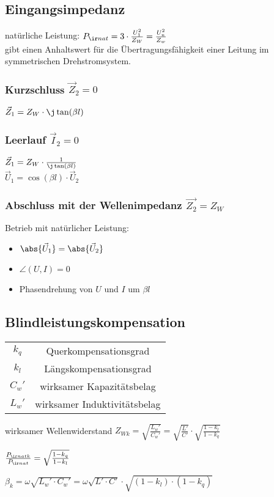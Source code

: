 \documentclass[german]{latex4ei/latex4ei_sheet}
\begin{document}
\begin{sectionbox}
	\subsection{Eingangsimpedanz}
	natürliche Leistung: $P_{\ir nat} = 3 \cdot \frac{U_1^2}{Z_W} = \frac{U_n^2}{Z_w}$ \\
	gibt einen Anhaltswert für die Übertragungsfähigkeit einer Leitung im symmetrischen Drehstromsystem.\\

	\subsubsection{Kurzschluss $\vec Z_2 = 0$}
	$\vec Z_1 = Z_W \cdot \j \tan (\beta l)$ \\

	\subsubsection{Leerlauf $\vec I_2 = 0$}
	$\vec Z_1 = Z_W \cdot \frac{1}{\j \tan ( \beta l)}$ \\
	$\vec U_1 = \cos (\beta l) \cdot \vec U_2$ \\

	\subsubsection{Abschluss mit der Wellenimpedanz $\vec{Z_2} = Z_W$}
	Betrieb mit natürlicher Leistung:
	\begin{itemize}
		\item $\abs{\vec U_1} = \abs{\vec U_2}$
		\item $\angle (U, I) = 0$
		\item Phasendrehung von $U$ und $I$ um $\beta l$
	\end{itemize}
\end{sectionbox}

\begin{sectionbox}
\subsection{Blindleistungskompensation}
\begin{symbolbox}
	\begin{tabular}{cc}
	$k_q$ & Querkompensationsgrad \\
	$k_l$ & Längskompensationsgrad \\
	$C_w'$ & wirksamer Kapazitätsbelag \\
	$L_w'$ & wirksamer Induktivitätsbelag
	\end{tabular}
\end{symbolbox}

wirksamer Wellenwiderstand $Z_{W k} = \sqrt{\frac{L_w'}{C_w'}}  = \sqrt{\frac{L'}{C'}} \cdot \sqrt{\frac{1 - k_l}{1 - k_q}}	  $

$\frac{P_{\ir nat k}}{P_{\ir nat}} = \sqrt{\frac{1-k_q}{1-k_l}} $

$\beta_k = \omega \sqrt{L_w' \cdot C_w'} = \omega \sqrt{L' \cdot C'} \cdot \sqrt {(1-k_l)\cdot (1-k_q)}$
\end{sectionbox}
\end{document}
